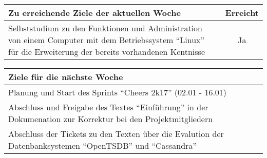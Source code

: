 \begin{tabularx}{\textwidth}{Xc}
    \arrayrulecolor{OliveGreen}
    \toprule
    {\bfseries Zu erreichende Ziele der aktuellen Woche} & {\bfseries Erreicht} \\
    \midrule[2pt]
    Selbststudium zu den Funktionen und Administration von einem Computer
    mit dem Betriebssystem ``Linux'' für die Erweiterung der bereits
    vorhandenen Kentnisse  &  Ja  \\
    \bottomrule[2pt]
\end{tabularx}
%
\vspace{1cm}
%
\begin{tabularx}{\textwidth}{Xc}
    \arrayrulecolor{OliveGreen}
    \toprule
    {\bfseries Ziele für die nächste Woche}              &                   \\
    \midrule[2pt]
    Planung und Start des Sprints ``Cheers 2k17'' (02.01 - 16.01)  &  \\
    \rowcolor{OliveGreen!15}
    Abschluss und Freigabe des Textes ``Einführung'' in der
    Dokumenation zur Korrektur bei den Projektmitgliedern  &  \\
    \rowcolor{White}
    Abschluss der Tickets zu den Texten über die Evalution der
    Datenbanksystemen ``OpenTSDB'' und ``Cassandra''  &  \\
\end{tabularx}
